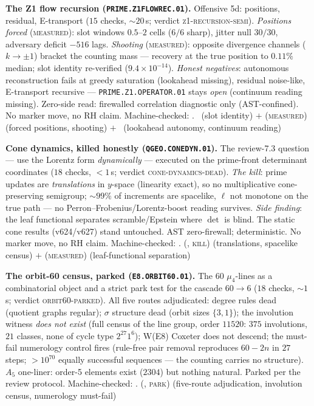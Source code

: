 \documentclass[11pt,a4paper]{article}
\theoremstyle{definition}
\begin{document}
\par\smallskip\noindent\textbf{The Z1 flow recursion
(\texttt{PRIME.Z1FLOWREC.01}).}
Offensive 5d: positions, residual, E-transport ($15$ checks,
${\sim}20$\,s; verdict \textsc{z1-recursion-semi}).  \emph{Positions
forced} (\textsc{measured}): slot windows $0.5$--$2$ cells ($6/6$
sharp), jitter null $30/30$, adversary deficit $-516$ lags.
\emph{Shooting} (\textsc{measured}): opposite divergence channels
($k\to\pm1$) bracket the counting mass --- recovery at the true
position to $0.11\%$ median; slot identity re-verified
($9.4\times10^{-14}$).  \emph{Honest negatives}: autonomous
reconstruction fails at greedy saturation (lookahead missing),
residual noise-like, E-transport recursive ---
\texttt{PRIME.Z1.OPERATOR.01} stays \emph{open} (continuum reading
missing).  Zero-side read: firewalled correlation diagnostic only
(AST-confined).  No marker move, no RH claim.
Machine-checked: .
\mE\ (slot identity) $+$ (\textsc{measured}) (forced positions,
shooting) $+$ \mO\ (lookahead autonomy, continuum reading)
\par\smallskip

\par\smallskip\noindent\textbf{Cone dynamics, killed honestly
(\texttt{QGEO.CONEDYN.01}).}
The review-7.3 question --- use the Lorentz form \emph{dynamically}
--- executed on the prime-front determinant coordinates ($18$
checks, ${<}1$\,s; verdict \textsc{cone-dynamics-dead}).  \emph{The
kill}: prime updates are \emph{translations} in $y$-space (linearity
exact), so no multiplicative cone-preserving semigroup;
${\sim}99\%$ of increments are spacelike, $\ell$ not monotone on the
true path --- no Perron--Frobenius/Lorentz-boost reading survives.
\emph{Side finding}: the leaf functional separates scramble/Epstein
where $\det$ is blind.  The static cone results (v624/v627) stand
untouched.  AST zero-firewall; deterministic.  No marker move, no RH
claim.
Machine-checked: .
(\mE, \textsc{kill}) (translations, spacelike census) $+$
(\textsc{measured}) (leaf-functional separation)
\par\smallskip

\par\smallskip\noindent\textbf{The orbit-60 census, parked
(\texttt{E8.ORBIT60.01}).}
The $60$ $\mu_4$-lines as a combinatorial object and a strict park
test for the cascade $60\to6$ ($18$ checks, ${\sim}1$\,s; verdict
\textsc{orbit60-parked}).  All five routes adjudicated: degree rules
dead (quotient graphs regular); $\sigma$ structure dead (orbit sizes
$\{3,1\}$); the involution witness \emph{does not exist} (full
census of the line group, order $11520$: $375$ involutions, $21$
classes, none of cycle type $2^{27}1^6$); W(E8) Coxeter does not
descend; the must-fail numerology control fires (rule-free pair
removal reproduces $60-2n$ in $27$ steps; $>10^{70}$ equally
successful sequences --- the counting carries no structure).  $A_5$
one-liner: order-5 elements exist ($2304$) but nothing natural.
Parked per the review protocol.
Machine-checked: .
(\mE, \textsc{park}) (five-route adjudication, involution census,
numerology must-fail)
\par\smallskip
\end{document}

